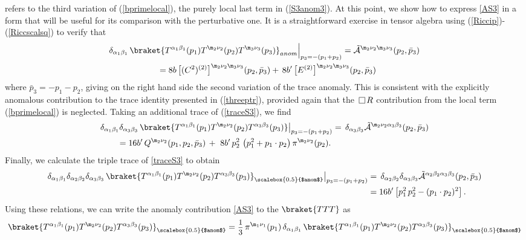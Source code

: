 \documentclass[a4paper,11pt,openright,twoside]{book}
\let\a=\alpha   \let\b=\beta   \let\g=\gamma   \let\d=\delta
\let\n=\nu      \let\x=\xi     \let\p=\pi      \let\r=\rho
\newcommand{\sdfrac}[2]{\mbox{\small$\displaystyle\frac{#1}{#2}$}}
\def\nbox#1#2{\vcenter{\hrule \hbox{\vrule height#2in
			\kern#1in \vrule} \hrule}}
\def\sq{\,\raise.5pt\hbox{$\nbox{.09}{.09}$}\,}
\numberwithin{equation}{section}
\begin{document}
{{refers to the third variation of (\ref{bprimelocal}), the purely local last term in (\ref{S3anom3}). 
{At this point, we show how to express \eqref{AS3} in a form that will be useful for its comparison with the perturbative one. It is a straightforward exercise 
in tensor algebra using (\ref{Riccip})-(\ref{Riccscalsq}) to verify that
\begin{align}
	&\delta_{\a_1\b_1}\,\braket{T^{\a_1\b_1}(p_1)T^{\m_2\n_2}(p_2)T^{\m_3\n_3}(p_3)}_{anom}\Big\vert_{p_3 = -(p_1 + p_2)} = \tilde{\mathcal{A}}^{\m_2\n_2\m_3\n_3}(p_2,\bar{p}_3)\notag\\
	&\hspace{2cm}=8 b\, \big[(C^2)^{(2)}\big]^{\m_2\n_2\m_3\n_3} (p_2, \bar{p}_3) + \,8b'\, \big[E^{(2)}\big]^{\m_2\n_2\m_3\n_3} (p_2, \bar{p}_3) 
	\label{traceS3}
\end{align}
where $\bar{p}_3=-p_1-p_2$,  giving on the right hand side the second variation of the trace anomaly. This is consistent with the explicitly anomalous contribution to the trace
identity presented in (\ref{threeptr}), provided again that the $\sq R$ contribution from the local term (\ref{bprimelocal}) 
is neglected. 
Taking an additional trace of (\ref{traceS3}), we find 
\begin{align}
	&\delta_{\a_1\b_1}\delta_{\a_3\b_3}\,\braket{T^{\a_1\b_1}(p_1)T^{\m_2\n_2}(p_2)T^{\a_3\b_3}(p_3)}\big\vert_{p_3 = -(p_1 + p_2)} 
	=  \, \delta_{\a_3\b_3}\tilde{\mathcal{A}}^{\m_2\n_2\a_3\b_3}(p_2,\bar{p}_3) \notag\\
	& \qquad = 16b'\, Q^{\m_2\n_2}(p_1,p_2,\bar{p}_3) \, + \ 8b'\,p_2^2\, \left( p_1^2  + p_1\cdot p_2\right)\pi^{\m_2\n_2}(p_2) .
	\label{dbltrace3}
\end{align}
Finally, we calculate the triple trace of \eqref{traceS3} to obtain
\begin{align}
	\delta_{\a_1\b_1}\delta_{\a_2\b_2}\delta_{\a_3\b_3}\,\braket{T^{\a_1\b_1}(p_1)T^{\m_2\n_2}(p_2)T^{\a_3\b_3}(p_3)}_{\scalebox{0.5}{$anom$}}\big\vert_{p_3 = -(p_1 + p_2)} &= \, \delta_{\a_2\b_2}\delta_{\a_3\b_3}\tilde{\mathcal{A}}^{\a_2\b_2\a_3\b_3}(p_2,\bar{p}_3)\notag\\
	&=
	16b' \left[ p_1^2\,p_2^2 - (p_1\cdot p_2)^2\right].
	\label{triptrace3}
\end{align}
Using these relations, we can write the anomaly contribution \eqref{AS3} to the $\braket{TTT}$ as 
\begin{align}
	&\braket{T^{\a_1\b_1}(p_1)T^{\m_2\n_2}(p_2)T^{\a_3\b_3}(p_3)}_{\scalebox{0.5}{$anom$}}=\sdfrac{1}{3}\, \pi^{\m_1\n_1}(p_1)\,\delta_{\a_1\b_1}\,\braket{T^{\a_1\b_1}(p_1)T^{\m_2\n_2}(p_2)T^{\a_3\b_3}(p_3)}_{\scalebox{0.5}{$anom$}}\notag\\

\end{align}}}}
\end{document}
